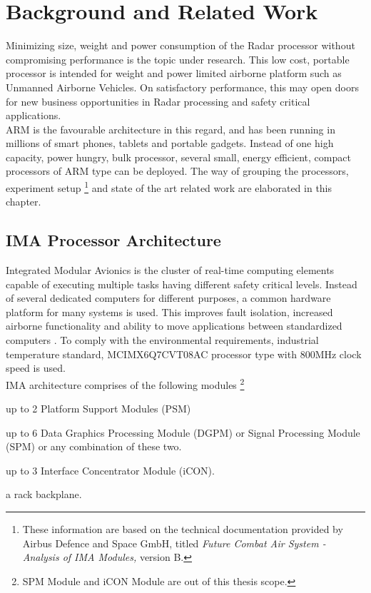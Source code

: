 \chapter{Background and Related Work}
\label{chap:bg_related_work}
Minimizing size, weight and power consumption of the Radar processor without compromising performance is the topic under research. This low cost, portable processor is intended for weight and power limited airborne platform such as Unmanned Airborne Vehicles. On satisfactory performance, this may open doors for new business opportunities in Radar processing and safety critical applications. \\
ARM is the favourable architecture in this regard, and has been running in millions of smart phones, tablets and portable gadgets. Instead of one high capacity, power hungry, bulk processor, several small, energy efficient, compact processors of ARM type can be deployed. The way of grouping the processors, experiment setup \footnote{These information are based on the technical documentation provided by Airbus Defence and Space GmbH, titled \textsl{Future Combat Air System - Analysis of IMA Modules,} version B.} and state of the art related work are elaborated in this chapter.

\section{IMA Processor Architecture} 
\label{sec:bg_related_work:ima}
Integrated Modular Avionics is the cluster of real-time computing elements capable of executing multiple tasks having different safety critical levels. Instead of several dedicated computers for different purposes, a common hardware platform for many systems is used. This improves fault isolation, increased airborne functionality and ability to move applications between standardized computers \cite{theAvionics}. To comply with the environmental requirements, industrial temperature standard, MCIMX6Q7CVT08AC processor type with 800MHz clock speed is used. \\

IMA architecture comprises of the following modules \footnote{SPM Module and iCON Module are out of this thesis scope.}
\begin{compactitem} 
	\item up to 2 Platform Support Modules (PSM) 
	\item up to 6 Data Graphics Processing Module (DGPM) or Signal Processing Module (SPM) or any combination of these two.
	\item up to 3 Interface Concentrator Module (iCON).
	\item a rack backplane.
\end{compactitem}

